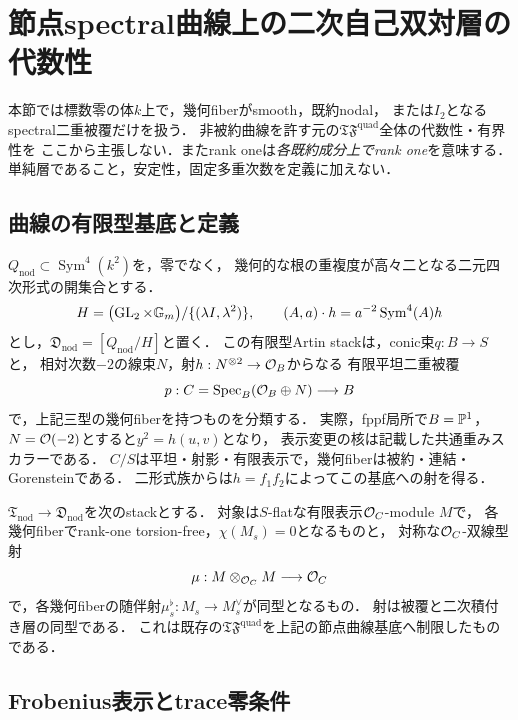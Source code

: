 \section{節点spectral曲線上の二次自己双対層の代数性}
\label{sec:qa-tf-quad-artin}

本節では標数零の体$k$上で，幾何fiberがsmooth，既約nodal，
または$I_2$となるspectral二重被覆だけを扱う．
非被約曲線を許す元の$\mathfrak{TF}^{\mathrm{quad}}$全体の代数性・有界性を
ここから主張しない．またrank oneは\emph{各既約成分上でrank one}を意味する．
単純層であること，安定性，固定多重次数を定義に加えない．

\subsection{曲線の有限型基底と定義}

$Q_{\mathrm{nod}}\subset\operatorname{Sym}^4(k^2)$を，零でなく，
幾何的な根の重複度が高々二となる二元四次形式の開集合とする．
\[
 H=\bigl(\operatorname{GL}_2\times\mathbb G_m\bigr)
       /\{(\lambda I,\lambda^2)\},\qquad
 (A,a)\cdot h=a^{-2}\operatorname{Sym}^4(A)h
\]
とし，$\mathfrak D_{\mathrm{nod}}=[Q_{\mathrm{nod}}/H]$と置く．
この有限型Artin stackは，conic束$q:B\to S$と，
相対次数$-2$の線束$N$，射$h:N^{\otimes2}\to\mathcal O_B$からなる
有限平坦二重被覆
\[
 p:C=\operatorname{Spec}_B(\mathcal O_B\oplus N)\longrightarrow B
\]
で，上記三型の幾何fiberを持つものを分類する．
実際，fppf局所で$B=\mathbb P^1$，$N=\mathcal O(-2)$とすると$y^2=h(u,v)$となり，
表示変更の核は記載した共通重みスカラーである．
$C/S$は平坦・射影・有限表示で，幾何fiberは被約・連結・Gorensteinである．
二形式族からは$h=f_1f_2$によってこの基底への射を得る．

$\mathfrak T_{\mathrm{nod}}\to\mathfrak D_{\mathrm{nod}}$を次のstackとする．
対象は$S$-flatな有限表示$\mathcal O_C$-module $M$で，
各幾何fiberでrank-one torsion-free，$\chi(M_s)=0$となるものと，
対称な$\mathcal O_C$-双線型射
\[
 \mu:M\otimes_{\mathcal O_C}M\longrightarrow\mathcal O_C
\]
で，各幾何fiberの随伴射$\mu_s^\flat:M_s\to M_s^\vee$が同型となるもの．
射は被覆と二次積付き層の同型である．
これは既存の$\mathfrak{TF}^{\mathrm{quad}}$を上記の節点曲線基底へ制限したものである．

\subsection{Frobenius表示とtrace零条件}

